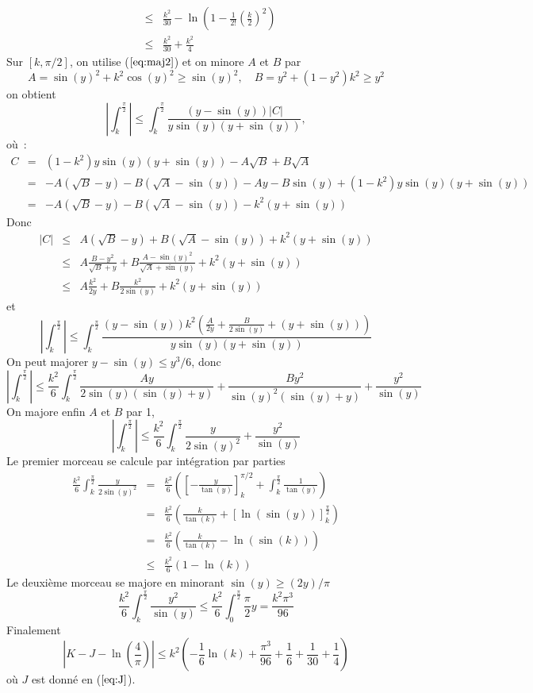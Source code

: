 \documentclass[a4paper,11pt]{book}
\begin{document}
\begin{giacjshere}
\begin{eqnarray*}
&\leq & \frac{k^2}{30}-  \ln (1- \frac{1}{2!}\left(\frac{k}{2}\right)^2) \\
&\leq &  \frac{k^2}{30} +\frac{k^2}{4}
\end{eqnarray*}
Sur $[k,\pi/2]$, on utilise (\(\ref{eq:maj2}\))
et on minore $A$ et $B$ par
\[ A=\sin(y)^2+k^2 \cos(y)^2 \geq \sin(y)^2, \quad B=y^2+(1-y^2)k^2 \geq y^2\]
on obtient
\[ 
| \int_k^{\frac{\pi}{2}} | \leq  \int_k^{\frac{\pi}{2}}
\frac{(y-\sin(y))|C|}
{y \sin(y) (y+\sin(y))} , 
\]
où~:
\begin{eqnarray*}
C&=&(1-k^2)y \sin(y)(y+\sin(y))-A\sqrt{B}+B\sqrt{A} \\
&=& -A(\sqrt{B}-y)-B(\sqrt{A}-\sin(y))
-Ay-B\sin(y) + (1-k^2)y \sin(y)(y+\sin(y)) \\
&=& -A(\sqrt{B}-y)-B(\sqrt{A}-\sin(y)) - k^2(y+\sin(y))
\end{eqnarray*}
Donc
\begin{eqnarray*}
 |C| &\leq& A(\sqrt{B}-y)+B(\sqrt{A}-\sin(y)) + k^2(y+\sin(y)) \\
&\leq& A \frac{B-y^2}{\sqrt{B}+y}
+ B \frac{A-\sin(y)^2}{\sqrt{A}+\sin(y)} + k^2(y+\sin(y)) \\
&\leq & A \frac{k^2}{2y} + B \frac{k^2}{2\sin(y)} + k^2(y+\sin(y))
\end{eqnarray*}
et
\[ 
| \int_k^{\frac{\pi}{2}} | \leq 
\int_k^{\frac{\pi}{2} }
\frac{(y-\sin(y))k^2(\frac{A}{2y} + \frac{B}{2\sin(y)} + (y+\sin(y))) }
{y \sin(y) (y+\sin(y))}
\]
On peut majorer $y-\sin(y) \leq y^3/6$, donc
\[ 
| \int_k^{\frac{\pi}{2}} | \leq 
\frac{k^2}{6} \int_k^{\frac{\pi}{2}}
 \frac{Ay}{2\sin(y) (\sin(y)+y)} + \frac{By^2}{\sin(y)^2(\sin(y)+y)} + \frac{y^2}{\sin(y)}
\]
On majore enfin $A$ et $B$ par 1, 
\[ | \int_k^{\frac{\pi}{2}} |
\leq \frac{k^2}{6} \int_k^{\frac{\pi}{2}}
\frac{y}{2\sin(y)^2} + \frac{y^2}{\sin(y)}
\]
Le premier morceau se calcule par intégration par parties
\begin{eqnarray*}
\frac{k^2}{6} \int_k^{\frac{\pi}{2}}
\frac{y}{2\sin(y)^2}
&=&
\frac{k^2}{6} \left( [-\frac{y}{\tan(y)}]_k^{\pi/2} 
+ \int_k^{\frac{\pi}{2}} \frac{1}{\tan(y)}
\right) \\
&=& \frac{k^2}{6} \left(\frac{k}{\tan(k)}+ [\ln(\sin(y))]_k^{\frac{\pi}{2}} \right)\\
&=& \frac{k^2}{6} \left(\frac{k}{\tan(k)}-\ln(\sin(k)) \right)\\
&\leq &  \frac{k^2}{6}(1-\ln(k))
\end{eqnarray*}
Le deuxième morceau se majore en minorant $\sin(y)\geq (2y)/\pi$
\[ 
\frac{k^2}{6} \int_k^{\frac{\pi}{2}} \frac{y^2}{\sin(y)}
\leq \frac{k^2}{6} \int_0^{\frac{\pi}{2}} \frac{\pi}{2} y
= \frac{k^2\pi^3}{96} 
\]
Finalement
\[ |K-J-\ln(\frac{4}{\pi})| 
\leq k^2 \left( -\frac{1}{6} \ln(k) + \frac{\pi^3}{96} + \frac{1}{6} + \frac{1}{30}+ 
\frac{1}{4} \right)
\]
où $J$ est donné en (\(\ref{eq:J}\)).


\end{giacjshere}
\end{document}
